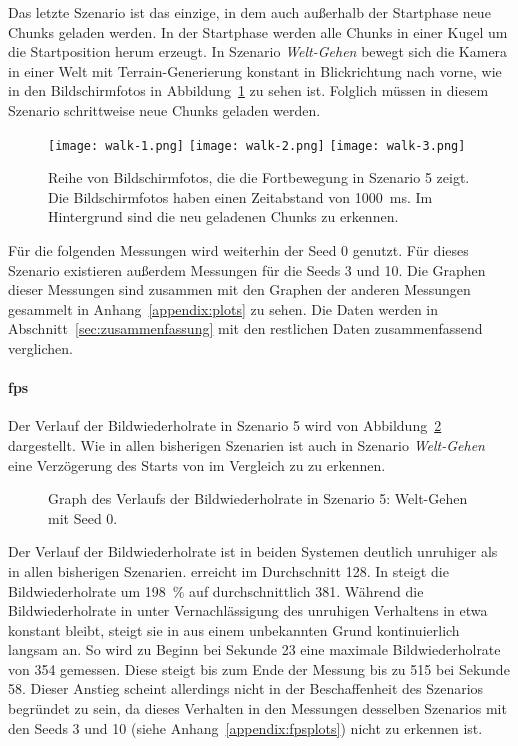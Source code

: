 Das letzte Szenario ist das einzige, in dem auch außerhalb der Startphase neue Chunks geladen werden. In der Startphase werden alle Chunks in einer Kugel um die Startposition herum erzeugt. In Szenario \emph{Welt-Gehen} bewegt sich die Kamera in einer Welt mit Terrain-Generierung konstant in Blickrichtung nach vorne, wie in den Bildschirmfotos in Abbildung~\ref{fig:walk} zu sehen ist. Folglich müssen in diesem Szenario schrittweise neue Chunks geladen werden.
\begin{figure}[!htbp]
	\centering
	\texttt{[image: walk-1.png]}
	\texttt{[image: walk-2.png]}
	\texttt{[image: walk-3.png]}
	\caption[Reihe von Bildschirmfotos, die die Fortbewegung in Szenario 5 zeigt.]{Reihe von Bildschirmfotos, die die Fortbewegung in Szenario 5 zeigt. Die Bildschirmfotos haben einen Zeitabstand von \SI{1000}{\milli\second}. Im Hintergrund sind die neu geladenen Chunks zu erkennen.}\label{fig:walk}
\end{figure}

Für die folgenden Messungen wird weiterhin der Seed 0 genutzt. Für dieses Szenario existieren außerdem Messungen für die Seeds 3 und 10. Die Graphen dieser Messungen sind zusammen mit den Graphen der anderen Messungen gesammelt in Anhang~\vref{appendix:plots} zu sehen. Die Daten werden in Abschnitt~\ref{sec:zusammenfassung} mit den restlichen Daten zusammenfassend verglichen.

\paragraph{\ac{fps}}
Der Verlauf der Bildwiederholrate in Szenario 5 wird von Abbildung~\ref{fig:seed-0-walk-fps} dargestellt. Wie in allen bisherigen Szenarien ist auch in Szenario \emph{Welt-Gehen} eine Verzögerung des Starts von \sysB{} im Vergleich zu \sysA{} zu erkennen.
\begin{figure}[!htbp]
	\caption{Graph des Verlaufs der Bildwiederholrate in Szenario 5: Welt-Gehen mit Seed 0.}\label{fig:seed-0-walk-fps}
\end{figure}
Der Verlauf der Bildwiederholrate ist in beiden Systemen deutlich unruhiger als in allen bisherigen Szenarien. \sysA{} erreicht im Durchschnitt \SI{128}{\fps}. In \sysB{} steigt die Bildwiederholrate um \SI{198}{\percent} auf durchschnittlich \SI{381}{\fps}. Während die Bildwiederholrate in \sysA{} unter Vernachlässigung des unruhigen Verhaltens in etwa konstant bleibt, steigt sie in \sysB{} aus einem unbekannten Grund kontinuierlich langsam an. So wird zu Beginn bei Sekunde 23 eine maximale Bildwiederholrate von \SI{354}{\fps} gemessen. Diese steigt bis zum Ende der Messung bis zu \SI{515}{\fps} bei Sekunde 58. Dieser Anstieg scheint allerdings nicht in der Beschaffenheit des Szenarios begründet zu sein, da dieses Verhalten in den Messungen desselben Szenarios mit den Seeds 3 und 10 (siehe Anhang~\vref{appendix:fpsplots}) nicht zu erkennen ist. 

